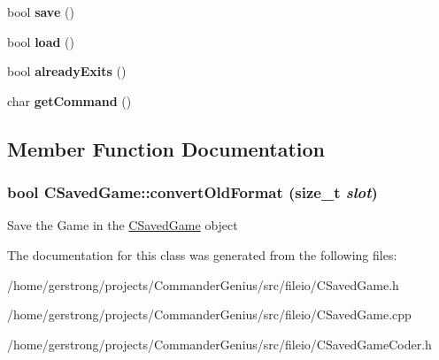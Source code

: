\begin{DoxyCompactItemize}
\item 
\hypertarget{class_c_saved_game_ae74f388107259ff2880103eae01b011d}{
bool {\bfseries save} ()}
\label{class_c_saved_game_ae74f388107259ff2880103eae01b011d}

\item 
\hypertarget{class_c_saved_game_a7f6ca98df48b1d7f5ad540ca60c01e5a}{
bool {\bfseries load} ()}
\label{class_c_saved_game_a7f6ca98df48b1d7f5ad540ca60c01e5a}

\item 
\hypertarget{class_c_saved_game_aa42cd4902814b218578a2fb3503ba139}{
bool {\bfseries alreadyExits} ()}
\label{class_c_saved_game_aa42cd4902814b218578a2fb3503ba139}

\item 
\hypertarget{class_c_saved_game_a8b8e1f122544cf799339854bdbc0e20d}{
char {\bfseries getCommand} ()}
\label{class_c_saved_game_a8b8e1f122544cf799339854bdbc0e20d}

\end{DoxyCompactItemize}


\subsection{Member Function Documentation}
\hypertarget{class_c_saved_game_aad40f2904291eb28ff7bb516b1bf272d}{
\subsubsection[{convertOldFormat}]{\setlength{\rightskip}{0pt plus 5cm}bool CSavedGame::convertOldFormat (size\_\-t {\em slot})}}
\label{class_c_saved_game_aad40f2904291eb28ff7bb516b1bf272d}


Save the Game in the \hyperlink{class_c_saved_game}{CSavedGame} object 



The documentation for this class was generated from the following files:\begin{DoxyCompactItemize}
\item 
/home/gerstrong/projects/CommanderGenius/src/fileio/CSavedGame.h\item 
/home/gerstrong/projects/CommanderGenius/src/fileio/CSavedGame.cpp\item 
/home/gerstrong/projects/CommanderGenius/src/fileio/CSavedGameCoder.h\end{DoxyCompactItemize}
